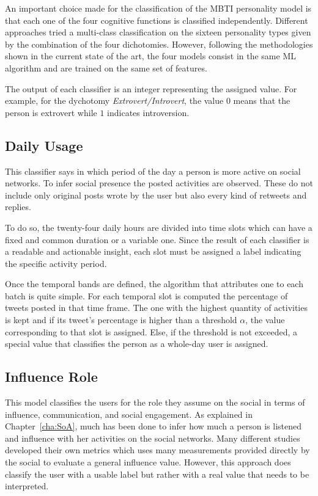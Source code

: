 An important choice made for the classification of the MBTI personality model is that each one of the four cognitive functions is classified independently.
Different approaches tried a multi-class classification on the sixteen personality types given by the combination of the four dichotomies.
However, following the methodologies shown in the current state of the art, the four models consist in the same ML algorithm and are trained on the same set of features.

The output of each classifier is an integer representing the assigned value. For example, for the dychotomy \textit{Extrovert/Introvert}, the value $0$ means that the person is extrovert while $1$ indicates introversion.

\subsection{Daily Usage}
This classifier says in which period of the day a person is more active on social networks.
To infer social presence the posted activities are observed. These do not include only original posts wrote by the user but also every kind of retweets and replies.

To do so, the twenty-four daily hours are divided into time slots which can have a fixed and common duration or a variable one.
Since the result of each classifier is a readable and actionable insight, each slot must be assigned a label indicating the specific activity period.

Once the temporal bands are defined, the algorithm  that attributes one to each batch is quite simple.
For each temporal slot is computed the percentage of tweets posted in that time frame.
The one with the highest quantity of activities is kept and if its tweet's percentage is higher than a threshold $\alpha$, the value corresponding to that slot is assigned.
Else, if the threshold is not exceeded, a special value that classifies the person as a whole-day user is assigned.

\subsection{Influence Role}
This model classifies the users for the role they assume on the social in terms of influence, communication, and social engagement.
As explained in Chapter~\ref{cha:SoA}, much has been done to infer how much a person is listened and influence with her activities on the social networks.
Many different studies developed their own metrics which uses many measurements provided directly by the social to evaluate a general influence value.
However, this approach does classify the user with a usable label but rather with a real value that needs to be interpreted.

